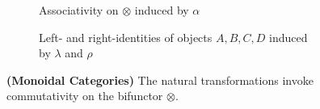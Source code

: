 \begin{figure}[ht]
        \vspace{\belowcaptionskip}
        \begin{subfigure}{\textwidth}
                \centering
                \caption{Associativity on $\otimes$ induced by $\alpha$}
        \end{subfigure}
        \vspace{-\belowcaptionskip}
        \begin{subfigure}{\textwidth}
                \centering
                \caption{Left- and right-identities of objects $A,B,C,D$ induced
                        by $\lambda$ and $\rho$}
        \end{subfigure}%
        \vspace{-.5em}
        \caption{\textbf{(Monoidal Categories)} The natural transformations
                invoke commutativity on the bifunctor $\otimes$.}
        \label{fig:monoidal-cat-commute}
\end{figure}

